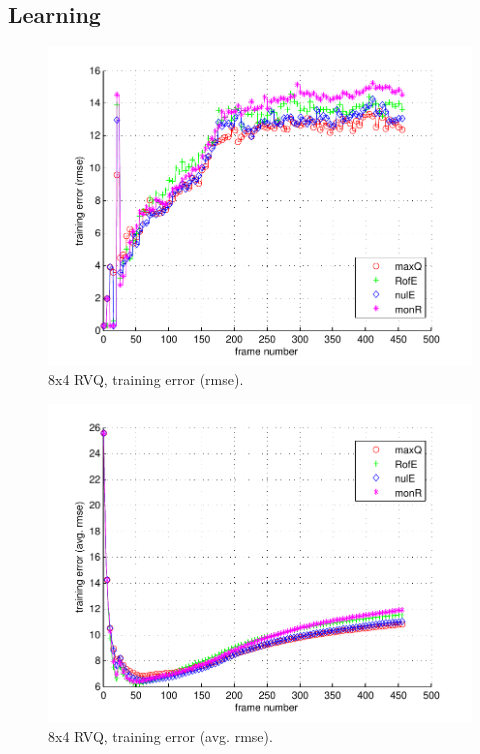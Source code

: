 \subsection{Learning}

								\begin{figure}[h!]
								\centering
								\includegraphics[height=0.4\textheight]{thesis/2_davidin300_8_4_1000_trg_rmse.pdf}
								\caption{8x4 RVQ, training error (rmse).}
								\label{fig:2_davidin300_8_4_1000_trg_rmse}
								\end{figure}


								\begin{figure}[h!]
								\centering
								\includegraphics[height=0.4\textheight]{thesis/2_davidin300_8_4_1000_trg_armse.pdf}
								\caption{8x4 RVQ, training error (avg. rmse).}
								\label{fig:2_davidin300_8_4_1000_trg_armse}
								\end{figure}

